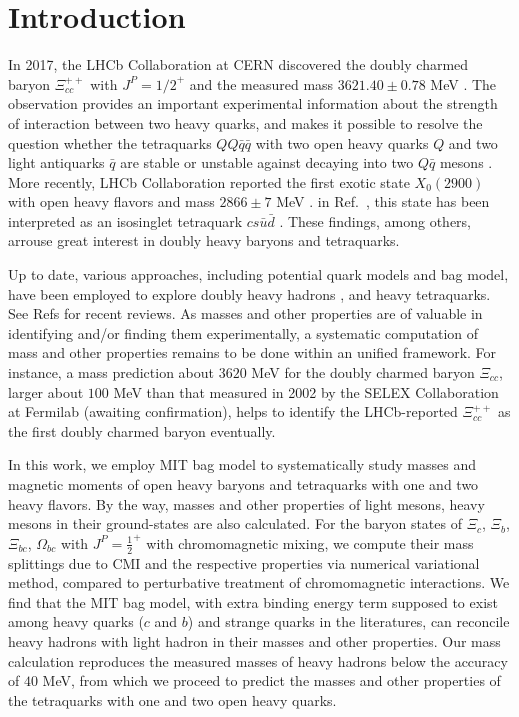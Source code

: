 \documentclass[prt,twocolumn,floatfix,nofootinbib]{revtex4}
\begin{document}
\maketitle\section{Introduction}
In 2017, the LHCb Collaboration at CERN discovered the doubly charmed baryon $\Xi_{cc}^{++}$ with $J^{P}={1/2}^{+}$ and the measured mass $3621.40\pm 0.78$ MeV \cite{Aaij:2017ueg}. The observation provides an important experimental information about the strength of interaction between two heavy quarks, and makes it possible to resolve the question whether the tetraquarks $QQ\bar{q}\bar{q}$ with two open heavy quarks $Q$ and two light antiquarks $\bar{q}$ are stable or unstable against decaying into two $Q\bar{q}$ mesons \cite{Karliner:2017qjm,Eichten:2017ffp,Luo:2017eub}.
More recently, LHCb Collaboration reported the first exotic state $X_{0}(2900)$ with open heavy flavors and mass $2866\pm 7$ MeV \cite{LHCb:2020kd}. in Ref.~\cite{Karliner:2020vsi}, this state has been interpreted as an isosinglet tetraquark $cs\bar{u}\bar{d}$ . These findings, among others, arrouse great interest in doubly heavy baryons and tetraquarks.

Up to date, various approaches, including potential quark models and bag model, have been employed to explore doubly heavy hadrons \cite{Fleck:1989mb,Ebert:2004ck,Bernotas:2012nz,He:2004px,Karliner:2014gca,Liu:2018euh} , and heavy tetraquarks\cite{}. See Refs \cite{Ali:2017jda,Liu:2019zoy} for recent reviews. As masses and other properties are of valuable in identifying and/or finding them experimentally, a systematic computation of mass and other properties remains to be done within an unified framework. For instance, a mass prediction about $3620$ MeV \cite{Ebert:2004ck,Karliner:2014gca} for the doubly charmed baryon $\Xi_{cc}$, larger about $100$ MeV than that measured in 2002 by the SELEX Collaboration at Fermilab \cite{Moinester:2002uw}(awaiting confirmation), helps to identify the LHCb-reported $\Xi_{cc}^{++}$ as the first doubly charmed baryon \cite{Aaij:2017ueg} eventually.

In this work, we employ MIT bag model to systematically study masses and magnetic moments of open heavy baryons and tetraquarks with one and two heavy flavors.
By the way, masses and other properties of light mesons, heavy mesons in their ground-states are also calculated. For the baryon states of $\Xi_{c}$, $\Xi_{b}$, $\Xi_{bc}$, $\Omega_{bc}$ with $J^{P}={\frac{1}{2}}^{+}$ with chromomagnetic mixing, we compute their mass splittings due to CMI and the respective properties via numerical variational method, compared to perturbative treatment of chromomagnetic interactions. We find that the MIT bag model, with extra binding energy term supposed to exist among heavy quarks ($c$ and $b$) and strange quarks in the literatures, can reconcile heavy hadrons with light hadron in their masses and other properties. Our mass calculation reproduces the measured masses of heavy hadrons below the accuracy of $40$ MeV, from which we proceed to predict the masses and other properties of the tetraquarks with one and two open heavy quarks.
\end{document}
